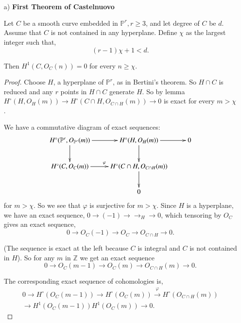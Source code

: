 \section{}\label{chap3:sec2}\pageoriginale
\begin{itemize}
\item [a)] {\bf First Theorem of Castelnuovo}
\begin{THM}\label{chap3:thm1}
Let $C$ be a smooth curve embedded in $\mathbb{P}^r,r\geq 3$, and let
degree of $C$ be $d$. Assume that $C$ is not contained in any
hyperplane. Define $\chi$ as the largest integer such that, 
$$
(r-1)\chi +1<d.
$$

Then $H^1(C,O_C(n))=0$ for every $n\geq\chi$.
\end{THM}

\begin{proof}
Choose $H$, a hyperplane of $\mathbb{P}^r$, as in Bertini's
theorem. So $H\cap C$ is reduced and any $r$ points in $H\cap C$
generate $H$. So by lemma $H^\circ(H,O_H(m))\longrightarrow H^\circ
(C\cap H,O_{C\cap H}(m))\longrightarrow 0$ is exact for every
$m>\chi$. 

We have a commutative diagram of exact sequences:
\[
\xymatrix{
H^\circ(\mathbb{P}^r, O_{\mathbb{P}^r}(m)) \ar[d] \ar[r] &
H^\circ(H,O_H(m))\ar[d] \ar[r] & 0\\
H^\circ(C,O_C(m)) \ar[r]^\varphi & H^\circ(C\cap H,O_{C\cap H}(m))
\ar[d]\\ 
& 0 &    
}
\]
for $m>\chi$. So we see that $\varphi$ is surjective for
$m>\chi$. Since $H$ is a hyperplane, we have an exact sequence, $0
\longrightarrow(-1)\longrightarrow\longrightarrow_H \longrightarrow
0$, which tensoring by $O_C$ gives an exact sequence,
$$
0\longrightarrow O_C(-1)\longrightarrow O_C\longrightarrow O_{C\cap H}
\longrightarrow 0.
$$

(The sequence is exact at the left because $C$ is integral and $C$ is
not contained in $H$). So for any $m$ in $\mathbb{Z}$ we get an exact
sequence
$$
0\longrightarrow O_C(m-1)\longrightarrow O_C(m)\longrightarrow
O_{C\cap H}(m)\longrightarrow 0.
$$

The corresponding exact sequence of cohomologies is,
\begin{gather*}
0\longrightarrow H^\circ(O_C(m-1))\longrightarrow H^\circ(O_C(m))
\xrightarrow{\varphi}H^\circ(O_{C\cap H}(m))\\
\longrightarrow H^1 (O_C(m-1))
H^1(O_C(m))\longrightarrow 0.
\end{gather*}\pageoriginale


\end{proof}
\end{itemize}
